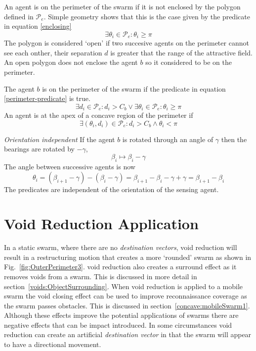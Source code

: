 \documentclass[preprint,12pt]{elsarticle}
\begin{document}
An agent is on the perimeter of the swarm if it is not enclosed by the polygon
defined in $\mathcal{P}_e$.  Simple geometry shows that this is the case given
by the predicate in equation \ref{enclosing}
\begin{equation}
	\exists \theta_i \in \mathcal{P}_e : \theta_i\geq\pi
	\label{enclosing}
\end{equation}
The polygon is considered `open' if two succesive agents on the perimeter 
cannot see each onther, their separation $d$ is greater that the range of the
attractive field.  An open polygon does not enclose the agent $b$ so it
considered to be on the perimeter.

The agent $b$ is on the perimeter of the swarm if the predicate in equation
\ref{perimeter-predicate} is true.
\begin{equation}
	\exists d_i\in\mathcal{P}_e:d_i>C_b \vee
	\exists\theta_i\in\mathcal{P}_e:\theta_i\geq\pi
	\label{perimeter-predicate}
\end{equation}
An agent is at the apex of a concave region of the perimeter if
\begin{equation}
	\exists(\theta_i,d_i)\in\mathcal{P}_e : d_i>C_b\wedge\theta_i<\pi
	\label{concave-predicate}
\end{equation}


\textit{Orientation independent}  If the agent $b$ is rotated through an angle of $\gamma$ then 
the bearings are rotated by $-\gamma$, \[ \beta_i\mapsto\beta_i-\gamma \]
The  angle between successive agents is now
\[
	\theta_i  =  (\beta_{i+1}-\gamma) - (\beta_i-\gamma)
	 = \beta_{i+1}-\beta_i-\gamma+\gamma
	 = \beta_{i+1}-\beta_i
\]
The predicates are independent of the orientation of the sensing agent.

\section{Void Reduction Application}\label{sec:ConcaveReductionApplication}
In a static swarm, where there are no \textit{destination vectors}, void reduction will result in a restructuring motion that creates a more `rounded' swarm as shown in Fig.~\ref{fig:OuterPerimeter3}. void reduction also creates a surround effect as it removes voids from a swarm. This is discussed in more detail in section~\ref{voids:ObjectSurrounding}. When void reduction is applied to a mobile swarm the void closing effect can be used to improve reconnaissance coverage as the swarm passes obstacles. This is discussed in section~\ref{concave:mobileSwarm1}.
Although these effects improve the potential applications of swarms there are negative effects that can be impact introduced. In some circumstances void reduction can create an artificial \textit{destination vector} in that the swarm will appear to have a directional movement. 
\end{document}
